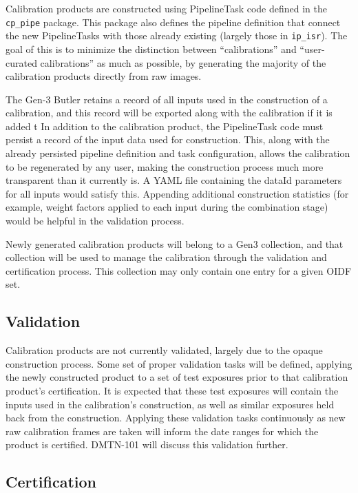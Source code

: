 \documentclass[DM,authoryear,toc]{lsstdoc}
\begin{document}
Calibration products are constructed using PipelineTask code defined
in the \verb|cp_pipe| package.  This package also defines the pipeline
definition that connect the new PipelineTasks with those already
existing (largely those in \verb|ip_isr|).  The goal of this is to
minimize the distinction between ``calibrations'' and ``user-curated
calibrations'' as much as possible, by generating the majority of the
calibration products directly from raw images.

The Gen-3 Butler retains a record of all inputs used in the construction of a calibration, and this record will be exported along with the calibration if it is added t
In addition to the calibration product, the PipelineTask code must
persist a record of the input data used for construction.  This, along
with the already persisted pipeline definition and task configuration,
allows the calibration to be regenerated by any user, making the
construction process much more transparent than it currently is.  A
YAML file containing the dataId parameters for all inputs would
satisfy this.  Appending additional construction statistics (for
example, weight factors applied to each input during the combination
stage) would be helpful in the validation process.

Newly generated calibration products will belong to a Gen3 collection,
and that collection will be used to manage the calibration through the
validation and certification process.  This collection may only
contain one entry for a given OIDF set.

\subsection{Validation}

Calibration products are not currently validated, largely due to the
opaque construction process.  Some set of proper validation tasks will
be defined, applying the newly constructed product to a set of test
exposures prior to that calibration product's certification.  It is
expected that these test exposures will contain the inputs used in the
calibration's construction, as well as similar exposures held back
from the construction.  Applying these validation tasks continuously
as new raw calibration frames are taken will inform the date ranges
for which the product is certified.  DMTN-101 will discuss this
validation further.

\subsection{Certification}
\end{document}
